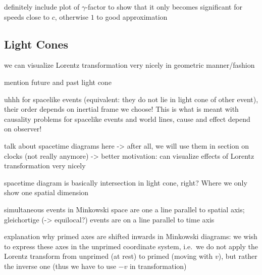 definitely include plot of $\gamma$-factor to show that it only becomes significant for speeds close to $c$, otherwise $1$ to good approximation



		\subsection{Light Cones}
we can visualize Lorentz transformation very nicely in geometric manner/fashion


mention future and past light cone


uhhh for spacelike events (equivalent: they do not lie in light cone of other event), their order depends on inertial frame we choose! This is what is meant with causality problems for spacelike events and world lines, cause and effect depend on observer!


talk about spacetime diagrams here -> after all, we will use them in section on clocks (not really anymore) -> better motivation: can visualize effects of Lorentz transformation very nicely

spacetime diagram is basically intersection in light cone, right? Where we only show one spatial dimension


simultaneous events in Minkowski space are one a line parallel to spatial axis; gleichortige (-> equilocal?) events are on a line parallel to time axis



explanation why primed axes are shifted inwards in Minkowski diagrams: we wish to express these axes in the unprimed coordinate system, i.e.~we do not apply the Lorentz transform from unprimed (at rest) to primed (moving with $v$), but rather the inverse one (thus we have to use $-v$ in transformation)



